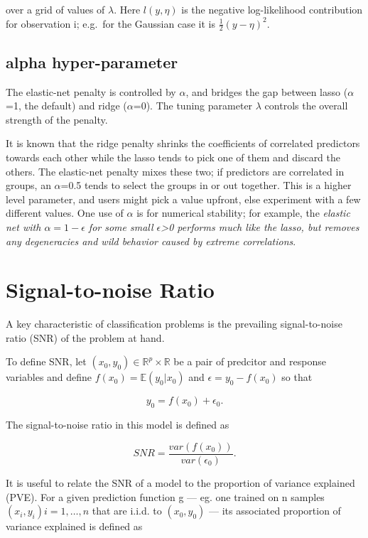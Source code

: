 \documentclass[
]{book}
\begin{document}
over a grid of values of \(\lambda\).
Here \(l(y,\eta)\) is the negative log-likelihood contribution for observation i;
e.g.~for the Gaussian case it is \(\frac{1}{2}(y-\eta)^2\).

\hypertarget{alpha-hyper-parameter}{%
\subsection*{\texorpdfstring{\textbf{alpha} hyper-parameter}{alpha hyper-parameter}}\label{alpha-hyper-parameter}}

The elastic-net penalty is controlled by \(\alpha\), and bridges the gap between
lasso (\(\alpha\)=1, the default) and ridge (\(\alpha\)=0).
The tuning parameter \(\lambda\) controls the overall strength of the penalty.

It is known that the ridge penalty shrinks the coefficients of correlated predictors
towards each other while the lasso tends to pick one of them and discard the others.
The elastic-net penalty mixes these two; if predictors are correlated in groups,
an \(\alpha\)=0.5 tends to select the groups in or out together.
This is a higher level parameter, and users might pick a value upfront,
else experiment with a few different values. One use of \(\alpha\) is for numerical stability;
for example, the \emph{elastic net with \(\alpha = 1 - \epsilon\) for some small \(\epsilon\)\textgreater0
performs much like the lasso, but removes any degeneracies and wild behavior caused
by extreme correlations}.

\hypertarget{signal-to-noise}{%
\section{Signal-to-noise Ratio}\label{signal-to-noise}}

A key characteristic of classification problems is the
prevailing signal-to-noise ratio (SNR) of the problem at hand.

To define SNR, let \((x_0, y_0) \in \mathbb{R}^p \times \mathbb{R}\)
be a pair of predcitor and response variables and define
\(f(x_0) = \mathbb{E}(y_0|x_0)\) and \(\epsilon = y_0 - f(x_0)\) so that

\[y_0 = f(x_0) + \epsilon_0.\]

The signal-to-noise ratio in this model is defined as

\[SNR=\frac{var(f(x_0))}{var(\epsilon_0)}.\]

It is useful to relate the SNR of a model to the proportion of variance explained (PVE).
For a given prediction function g --- eg. one trained on n samples
\((x_i, y_i) i = 1, \dots, n\) that are i.i.d. to \((x_0, y_0)\) --- its
associated proportion of variance explained is defined as
\end{document}
